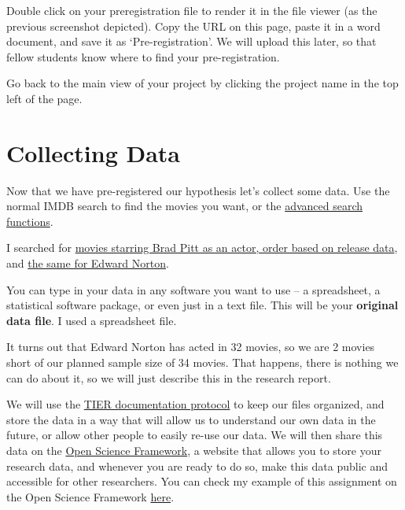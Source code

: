 \documentclass[
  oneside]{book}
\begin{document}
Double click on your preregistration file to render it in the file viewer (as
the previous screenshot depicted). Copy the URL on this page, paste it in a word
document, and save it as `Pre-registration'. We will upload this later, so that
fellow students know where to find your pre-registration.

Go back to the main view of your project by clicking the project name in the top
left of the page.

\hypertarget{collecting-data}{%
\section{Collecting Data}\label{collecting-data}}

Now that we have pre-registered our hypothesis let's collect some data. Use the
normal IMDB search to find the movies you want, or the \href{http://www.imdb.com/search/}{advanced search
functions}.

I searched for \href{http://www.imdb.com/filmosearch?role=nm0000093\&explore=title_type\&mode=detail\&page=1\&title_type=movie\&ref_=filmo_ref_job_typ\&sort=release_date,desc\&job_type=actor}{movies starring Brad Pitt as an actor, order based on release
data},
and \href{http://www.imdb.com/filmosearch?role=nm0001570\&explore=title_type\&mode=detail\&page=1\&title_type=movie\&ref_=filmo_ref_job_typ\&sort=release_date,desc\&job_type=actor}{the same for Edward
Norton}.

You can type in your data in any software you want to use -- a spreadsheet, a
statistical software package, or even just in a text file. This will be your
\textbf{original data file}. I used a spreadsheet file.

It turns out that Edward Norton has acted in 32 movies, so we are 2 movies short
of our planned sample size of 34 movies. That happens, there is nothing we can
do about it, so we will just describe this in the research report.

We will use the \href{https://www.projecttier.org/tier-protocol/}{TIER documentation
protocol} to keep our files
organized, and store the data in a way that will allow us to understand our own
data in the future, or allow other people to easily re-use our data. We
will then share this data on the \href{http://www.osf.io}{Open Science Framework}, a
website that allows you to store your research data, and whenever you are ready
to do so, make this data public and accessible for other researchers. You can
check my example of this assignment on the Open Science Framework
\href{https://osf.io/r4hab/}{here}.
\end{document}
